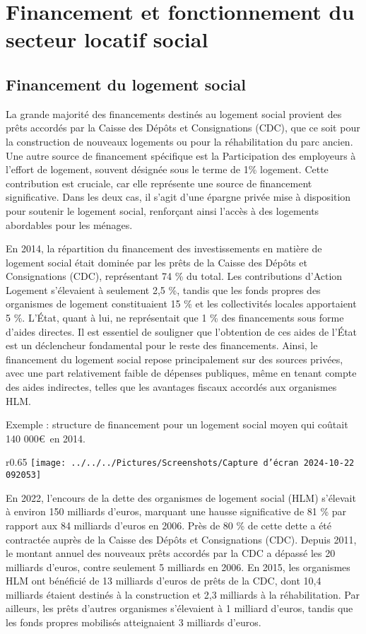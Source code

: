 \documentclass[a4paper, 12pt]{report}
\begin{document}
\section{Financement et fonctionnement du secteur locatif social}

\subsection{Financement du logement social}

La grande majorité des financements destinés au logement social provient des prêts accordés par la Caisse des Dépôts et Consignations (CDC), que ce soit pour la construction de nouveaux logements ou pour la réhabilitation du parc ancien. Une autre source de financement spécifique est la Participation des employeurs à l’effort de logement, souvent désignée sous le terme de 1\% logement. Cette contribution est cruciale, car elle représente une source de financement significative. Dans les deux cas, il s'agit d'une épargne privée mise à disposition pour soutenir le logement social, renforçant ainsi l'accès à des logements abordables pour les ménages.

En 2014, la répartition du financement des investissements en matière de logement social était dominée par les prêts de la Caisse des Dépôts et Consignations (CDC), représentant 74 \% du total. Les contributions d'Action Logement s'élevaient à seulement 2,5 \%, tandis que les fonds propres des organismes de logement constituaient 15 \% et les collectivités locales apportaient 5 \%. L'État, quant à lui, ne représentait que 1 \% des financements sous forme d'aides directes. Il est essentiel de souligner que l'obtention de ces aides de l'État est un déclencheur fondamental pour le reste des financements. Ainsi, le financement du logement social repose principalement sur des sources privées, avec une part relativement faible de dépenses publiques, même en tenant compte des aides indirectes, telles que les avantages fiscaux accordés aux organismes HLM.

Exemple : structure de financement pour un logement social moyen qui coûtait 140 000\euro~en 2014.

\newpage
\begin{wrapfigure}{r}{0.65\textwidth}
	\centering
	\texttt{[image: ../../../Pictures/Screenshots/Capture d'écran 2024-10-22 092053]}
\end{wrapfigure}

En 2022, l'encours de la dette des organismes de logement social (HLM) s'élevait à environ 150 milliards d'euros, marquant une hausse significative de 81 \% par rapport aux 84 milliards d'euros en 2006. Près de 80 \% de cette dette a été contractée auprès de la Caisse des Dépôts et Consignations (CDC). Depuis 2011, le montant annuel des nouveaux prêts accordés par la CDC a dépassé les 20 milliards d'euros, contre seulement 5 milliards en 2006. En 2015, les organismes HLM ont bénéficié de 13 milliards d'euros de prêts de la CDC, dont 10,4 milliards étaient destinés à la construction et 2,3 milliards à la réhabilitation. Par ailleurs, les prêts d'autres organismes s'élevaient à 1 milliard d'euros, tandis que les fonds propres mobilisés atteignaient 3 milliards d'euros.
\end{document}
